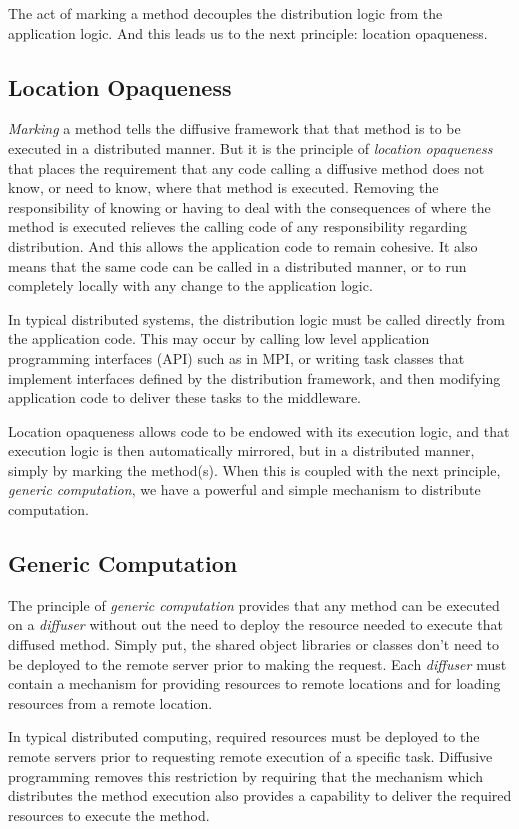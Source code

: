 \documentclass[11pt]{amsart}
\begin{document}
The act of marking a method decouples the distribution logic from the application logic. And this leads us to the next principle: location opaqueness.

\subsection{Location Opaqueness}
\emph{Marking} a method tells the diffusive framework that that method is to be executed in a distributed manner. But it is the principle of \emph{location opaqueness} that places the requirement that any code calling a diffusive method does not know, or need to know, where that method is executed. Removing the responsibility of knowing or having to deal with the consequences of where the method is executed relieves the calling code of any responsibility regarding distribution. And this allows the application code to remain cohesive. It also means that the same code can be called in a distributed manner, or to run completely locally with any change to the application logic.

In typical distributed systems, the distribution logic must be called directly from the application code. This may occur by calling low level application programming interfaces (API) such as in MPI, or writing task classes that implement interfaces defined by the distribution framework, and then modifying application code to deliver these tasks to the middleware.

Location opaqueness allows code to be endowed with its execution logic, and that execution logic is then automatically mirrored, but in a distributed manner, simply by marking the method(s). When this is coupled with the next principle, \emph{generic computation}, we have a powerful and simple mechanism to distribute computation.

\subsection{Generic Computation}
The principle of \emph{generic computation} provides that any method can be executed on a \emph{diffuser} without out the need to deploy the resource needed to execute that diffused method. Simply put, the shared object libraries or classes don't need to be deployed to the remote server prior to making the request. Each \emph{diffuser} must contain a mechanism for providing resources to remote locations and for loading resources from a remote location.

In typical distributed computing, required resources must be deployed to the remote servers prior to requesting remote execution of a specific task. Diffusive programming removes this restriction by requiring that the mechanism which distributes the method execution also provides a capability to deliver the required resources to execute the method. 
\end{document}
